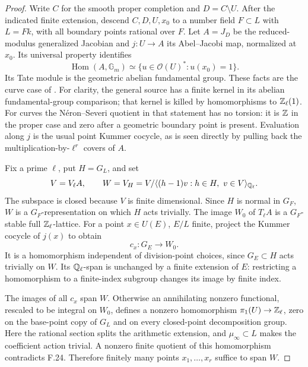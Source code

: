 \begin{proof}
Write $C$ for the smooth proper completion and $D=C\setminus U$.
After the indicated finite extension, descend $C,D,U,x_0$ to
a number field $F\subset L$ with $L=Fk$, with all boundary
points rational over $F$. Let $A=J_D$ be the reduced-modulus
generalized Jacobian and $j:U\to A$ its Abel--Jacobi map,
normalized at $x_0$. Its universal property identifies
\[
 \operatorname{Hom}(A,\mathbb G_m)
 \simeq\{u\in\mathcal O(U)^*:u(x_0)=1\}.
\]
Its Tate module is the geometric abelian fundamental group.
These facts are the curve case of
\citet[Section~3 and Propositions~4.1--4.3]{F_SpiessSzamuely2003}.
For clarity, the general source has a finite kernel in its
abelian fundamental-group comparison; that kernel is killed by
homomorphisms to $\mathbb Z_\ell(1)$. For curves the N\'eron--Severi
quotient in that statement has no torsion: it is $\mathbb Z$ in the
proper case and zero after a geometric boundary point is present.
Evaluation along $j$ is the usual point Kummer cocycle, as is
seen directly by pulling back the multiplication-by-$\ell^r$
covers of $A$.

Fix a prime $\ell$, put $H=G_L$, and set
\[
 V=V_\ell A,\qquad
 W=V_H=V/\langle(h-1)v:h\in H,\ v\in V\rangle_{\mathbb Q_\ell}.
\]
The subspace is closed because $V$ is finite dimensional.
Since $H$ is normal in $G_F$, $W$ is a $G_F$-representation
on which $H$ acts trivially. The image $W_0$ of $T_\ell A$
is a $G_F$-stable full $\mathbb Z_\ell$-lattice.
For a point $x\in U(E)$, $E/L$ finite, project the Kummer
cocycle of $j(x)$ to obtain
\[
 c_x:G_E\longrightarrow W_0.
\]
It is a homomorphism independent of division-point choices,
since $G_E\subset H$ acts trivially on $W$. Its
$\mathbb Q_\ell$-span is unchanged by a finite extension of $E$:
restricting a homomorphism to a finite-index subgroup changes
its image by finite index.

The images of all $c_x$ span $W$. Otherwise an annihilating
nonzero functional, rescaled to be integral on $W_0$, defines
a nonzero homomorphism $\pi_1(U)\to\mathbb Z_\ell$, zero on the
base-point copy of $G_L$ and on every closed-point decomposition
group. Here the rational section splits the arithmetic extension,
and $\mu_\infty\subset L$ makes the coefficient action trivial.
A nonzero finite quotient of this homomorphism contradicts
F.24. Therefore finitely many points $x_1,\ldots,x_r$ suffice
to span $W$.


\end{proof}
